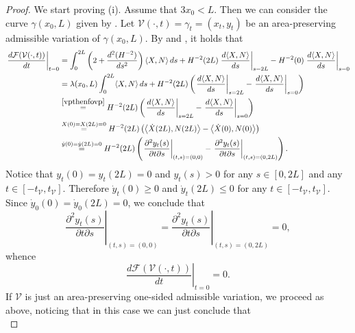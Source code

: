 \documentclass[11pt]{amsart}
\renewcommand{\leq}{\leqslant}
\renewcommand{\geq}{\geqslant}
\newcommand{\F}{\mathcal F}
\theoremstyle{definition}
\theoremstyle{remark}
\numberwithin{equation}{section}
\begin{document}
\begin{proof}
We start proving (i). Assume that $3x_0<L$. Then we can consider the curve $\gamma(x_0,L)$ given by . Let $\mathcal V(\cdot,t)=\gamma_t=(x_t,y_t)$ be an area-preserving admissible variation of $\gamma(x_0,L)$. By  and , it holds that
\begin{equation*}
	\begin{split}
		\left.\frac{d\F(\mathcal V(\cdot,t))}{dt}\right|_{t=0}&=\int_0^{2L}\left(2+\frac{d^2(H^{-2})}{ds^2}\right)\langle X,N\rangle\,ds+ H^{-2}(2L)\left.\frac{d\langle X,N\rangle}{ds}\right|_{s=2L}-H^{-2}(0)\left.\frac{d\langle X,N\rangle}{ds}\right|_{s=0}\\
		&        =\lambda(x_0,L)\int_0^{2L}\langle X,N\rangle\,ds+ H^{-2}(2L)\left(\left.\frac{d\langle X,N\rangle}{ds}\right|_{s=2L}-\left.\frac{d\langle X,N\rangle}{ds}\right|_{s=0}\right)\\
		&\overset{\eqref{vpthenfovp}}{=} H^{-2}(2L)\left(\left.\frac{d\langle X,N\rangle}{ds}\right|_{s=2L}-\left.\frac{d\langle X,N\rangle}{ds}\right|_{s=0}\right)\\
		&\overset{X(0)=X(2L)=0}{=} H^{-2}(2L)\left(\left\langle\dot X(2L),N(2L)\right\rangle-\left\langle\dot X(0),N(0)\right\rangle\right)\\
		&\overset{\dot y(0)=\dot y(2L)=0}{=} H^{-2}(2L)\left(\left.\frac{\partial^2y_t(s)}{\partial t\partial s}\right|_{(t,s)=(0,0)}-\left.\frac{\partial^2y_t(s)}{\partial t\partial s}\right|_{(t,s)=(0,2L)}\right).
	\end{split} 
\end{equation*}
Notice that $y_t(0)=y_t(2L)=0$ and $y_t(s)>0$ for any $s\in[0,2L]$ and any $t\in[-t_{\mathcal V},t_{\mathcal V}]$. Therefore $\dot y_t(0)\geq 0$ and $\dot y_t(2L)\leq 0$ for any $t\in[-t_{\mathcal V},t_{\mathcal V}]$. Since $\dot y_0(0)=\dot y_0(2L)=0$, we conclude that 
\begin{equation*}
	\left.\frac{\partial^2y_t(s)}{\partial t\partial s}\right|_{(t,s)=(0,0)}=\left.\frac{\partial^2y_t(s)}{\partial t\partial s}\right|_{(t,s)=(0,2L)}=0,
\end{equation*}
whence 
\begin{equation*}
	\left.\frac{d\F(\mathcal V(\cdot,t))}{dt}\right|_{t=0}=0.
\end{equation*}
If $\mathcal V$ is just an area-preserving one-sided admissible variation, we proceed as above, noticing that in this case we can just conclude that 
\begin{equation*}

\end{equation*}
\end{proof}
\end{document}
